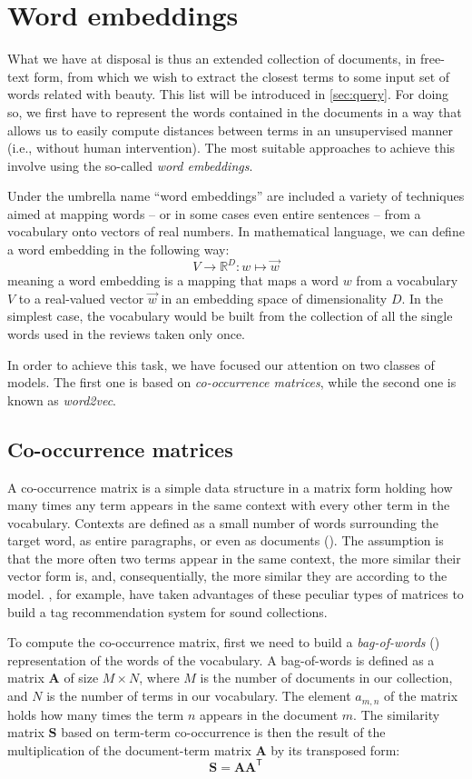 \section{Word embeddings}
What we have at disposal is thus an extended collection of documents, in free-text form, from which we wish to extract the closest terms to some input set of words related with beauty. This list will be introduced in \autoref{sec:query}. For doing so, we first have to represent the words contained in the documents in a way that allows us to easily compute distances between terms in an unsupervised manner (i.e., without human intervention). The most suitable approaches to achieve this involve using the so-called \emph{word embeddings}.

Under the umbrella name ``word embeddings'' are included a variety of  techniques aimed at mapping words -- or in some cases even entire sentences -- from a vocabulary onto vectors of real numbers. In mathematical language, we can define a word embedding in the following way:
$$
V \rightarrow \mathbb{R}^D : w \mapsto \vec{w}
$$
meaning a word embedding is a mapping that maps a word $w$ from a vocabulary $V$ to a real-valued vector $\vec{w}$ in an embedding space of dimensionality $D$. In the simplest case, the vocabulary would be built from the collection of all the single words used in the reviews taken only once.

In order to achieve this task, we have focused our attention on two classes of models. The first one is based on \emph{co-occurrence matrices}, while the second one is known as \emph{word2vec}.

\subsection{Co-occurrence matrices}\label{subsec:coocc}
A co-occurrence matrix is a simple data structure in a matrix form holding how many times any term appears in the same context with every other term in the vocabulary. Contexts are defined as a small number of words surrounding the target word, as entire paragraphs, or even as documents (\cite{pado2007dependency}). The assumption is that the more often two terms appear in the same context, the more similar their vector form is, and, consequentially, the more similar they are according to the model. \cite{font2013folksonomy}, for example, have taken advantages of these peculiar types of matrices to build a tag recommendation system for sound collections.

To compute the co-occurrence matrix, first we need to build a \emph{bag-of-words} () representation of the words of the vocabulary. A bag-of-words is defined as a matrix $\mathbf{A}$ of size $M \times N$, where $M$ is the number of documents in our collection, and $N$ is the number of terms in our vocabulary. The element $a_{m,n}$ of the matrix holds how many times the term $n$ appears in the document $m$. The similarity matrix $\mathbf{S}$ based on term-term co-occurrence is then the result of the multiplication of the document-term matrix $\mathbf{A}$ by its transposed form:
$$
\mathbf{S} = \mathbf{A}\mathbf{A}^\mathsf{T}
$$

